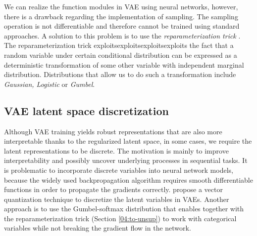 We can realize the function modules in VAE using neural networks, however, there is a drawback regarding the implementation of sampling.
The sampling operation is not differentiable and therefore cannot be trained using standard approaches.
A solution to this problem is to use the \textit{reparameterization trick} \cite{kingma2013auto}.
The reparameterization trick exploitsexploitsexploitsexploits the fact that a random variable under certain conditional distribution can be expressed as a deterministic transformation of some other variable with independent marginal distribution.
Distributions that allow us to do such a transformation include \textit{Gaussian, Logistic} or \textit{Gumbel}.

\subsection{VAE latent space discretization}
\label{background:vae_discrete}
Although VAE training yields robust representations that are also more interpretable thanks to the regularized latent space, in some cases, we require the latent representations to be discrete.
The motivation is mainly to improve interpretability and possibly uncover underlying processes in sequential tasks.
It is problematic to incorporate discrete variables into neural network models, because the widely used backpropagation algorithm requires smooth differentiable functions in order to propagate the gradients correctly.
\citet{van2017neural} propose a vector quantization technique to discretize the latent variables in VAEs.
Another approach is to use the Gumbel-softmax distribution \cite{jang2016categorical} that enables together with the reparameterization trick (Section \ref{04:to-unsup}) to work with categorical variables while not breaking the gradient flow in the network.

